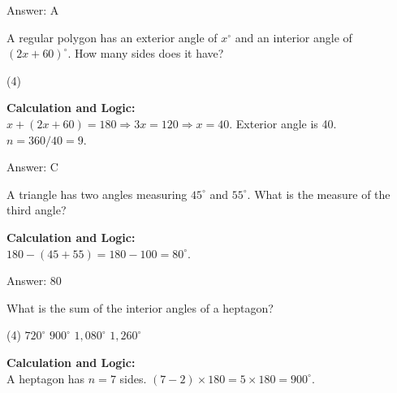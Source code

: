 \documentclass[11pt,paper=a4,answers]{exam}
\begin{document}
\begin{questions}
\begin{solution}
\vspace{30pt}

Answer: \colorbox{yellow!100}{A}
\end{solution}

\vspace{60pt}

\question
A regular polygon has an exterior angle of $x^\circ$ and an interior angle of $(2x + 60)^\circ$. How many sides does it have?
\begin{tasks}(4)
\end{tasks}

\begin{solution}
\textbf{Calculation and Logic:} \\
$x + (2x + 60) = 180 \Rightarrow 3x = 120 \Rightarrow x = 40$. Exterior angle is 40. $n = 360 / 40 = 9$.

\vspace{30pt}

Answer: \colorbox{yellow!100}{C}
\end{solution}

\vspace{60pt}

\question
A triangle has two angles measuring $45^\circ$ and $55^\circ$. What is the measure of the third angle?

\begin{solution}
\textbf{Calculation and Logic:} \\
$180 - (45 + 55) = 180 - 100 = 80^\circ$.

\vspace{30pt}

Answer: \colorbox{yellow!100}{80}
\end{solution}

\vspace{60pt}

\question
What is the sum of the interior angles of a heptagon?
\begin{tasks}(4)
    \task $720^\circ$
    \task $900^\circ$
    \task $1,080^\circ$
    \task $1,260^\circ$
\end{tasks}

\begin{solution}
\textbf{Calculation and Logic:} \\
A heptagon has $n = 7$ sides. $(7 - 2) \times 180 = 5 \times 180 = 900^\circ$.


\end{solution}
\end{questions}
\end{document}
